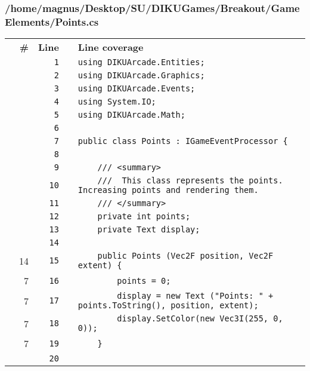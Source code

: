 \documentclass[a4paper,landscape,10pt]{article}
\begin{document}
\subsubsection{/home/magnus/Desktop/SU/DIKUGames/Breakout/GameElements/Points.cs}
\begin{longtable}[l]{lrrll}
\textbf{} & \textbf{\#} & \textbf{Line} & \textbf{} & \textbf{Line coverage}\\
\cellcolor{gray} &  & \verb~1~ & & \verb~using DIKUArcade.Entities;~\\
\cellcolor{gray} &  & \verb~2~ & & \verb~using DIKUArcade.Graphics;~\\
\cellcolor{gray} &  & \verb~3~ & & \verb~using DIKUArcade.Events;~\\
\cellcolor{gray} &  & \verb~4~ & & \verb~using System.IO;~\\
\cellcolor{gray} &  & \verb~5~ & & \verb~using DIKUArcade.Math;~\\
\cellcolor{gray} &  & \verb~6~ & & \verb~~\\
\cellcolor{gray} &  & \verb~7~ & & \verb~public class Points : IGameEventProcessor {~\\
\cellcolor{gray} &  & \verb~8~ & & \verb~~\\
\cellcolor{gray} &  & \verb~9~ & & \verb~    /// <summary>~\\
\cellcolor{gray} &  & \verb~10~ & & \verb~    ///  This class represents the points. Increasing points and rendering them.~\\
\cellcolor{gray} &  & \verb~11~ & & \verb~    /// </summary>~\\
\cellcolor{gray} &  & \verb~12~ & & \verb~    private int points;~\\
\cellcolor{gray} &  & \verb~13~ & & \verb~    private Text display;~\\
\cellcolor{gray} &  & \verb~14~ & & \verb~~\\
\cellcolor{green} & 14 & \verb~15~ & & \verb~    public Points (Vec2F position, Vec2F extent) {~\\
\cellcolor{green} & 7 & \verb~16~ & & \verb~        points = 0;~\\
\cellcolor{green} & 7 & \verb~17~ & & \verb~        display = new Text ("Points: " + points.ToString(), position, extent);~\\
\cellcolor{green} & 7 & \verb~18~ & & \verb~        display.SetColor(new Vec3I(255, 0, 0));~\\
\cellcolor{green} & 7 & \verb~19~ & & \verb~    }~\\
\cellcolor{gray} &  & \verb~20~ & & \verb~~\\

\end{longtable}
\end{document}
